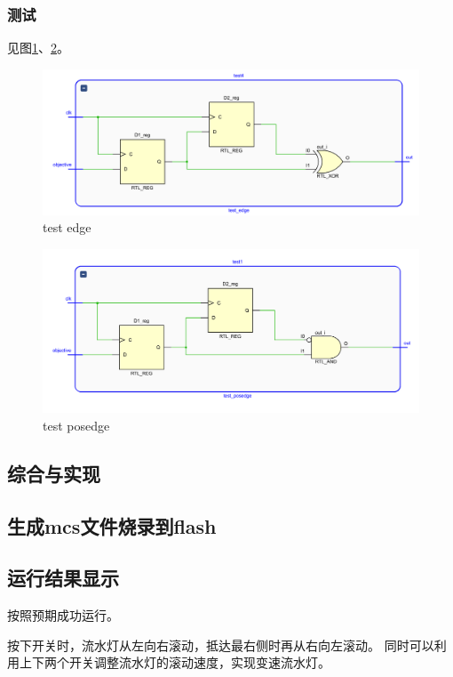 \documentclass[UTF8]{article}
\begin{document}
\subsubsection{测试}

见图\ref{FIG.10}、\ref{FIG.11}。

\begin{figure}[H]
    \centering
    \includegraphics[width=\linewidth]{test_edge.PNG}
    \caption{test edge}
    \label{FIG.10}
\end{figure}
\begin{figure}[H]
    \centering
    \includegraphics[width=\linewidth]{test_posedge.PNG}
    \caption{test posedge}
    \label{FIG.11}
\end{figure}
\subsection{综合与实现}
\subsection{生成mcs文件烧录到flash}
\subsection{运行结果显示}
按照预期成功运行。

按下开关时，流水灯从左向右滚动，抵达最右侧时再从右向左滚动。
同时可以利用上下两个开关调整流水灯的滚动速度，实现变速流水灯。
\end{document}
